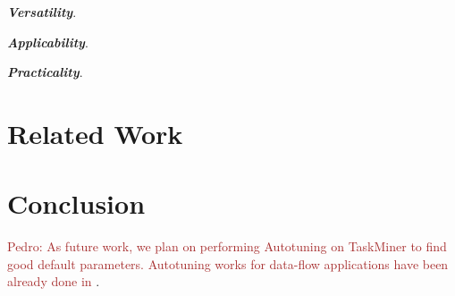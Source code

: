 \documentclass[sigplan,10pt,review,anonymous]{acmart}
\newcommand{\pedro}[1]{\noindent\textcolor{brown}{Pedro: {#1}}}
\newcommand{\pedro}[1]{}
\newcommand\Taskminer{\mbox{\textsf{TaskMiner}}}
\begin{document}
\textbf{\textit{Versatility}}.


\textbf{\textit{Applicability}}.


\textbf{\textit{Practicality}}.


\section{Related Work}
\label{sec:rw}


\section{Conclusion}
\label{sec:conc}

\pedro{As future work, we plan on performing Autotuning on {\Taskminer} to find good default parameters.
Autotuning works for data-flow applications have been already done in \cite{Trancoso17, Emani15}}.


\end{document}
